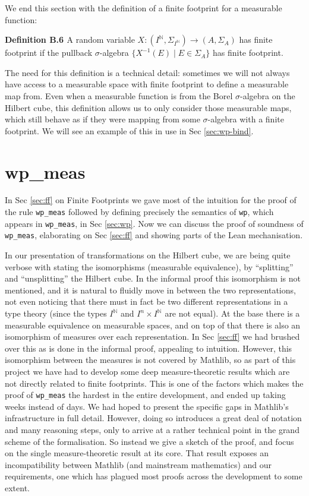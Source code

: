 We end this section with the definition of a finite footprint for a measurable function:

\textbf{Definition B.6 \citep[Appendix B]{lilac}} A random variable $X : (I^\mathbb{N}, \Sigma_{I^\mathbb{N}}) \to (A, \Sigma_A)$ has finite footprint if the pullback $\sigma$-algebra $\{X^{-1}(E) \mid E \in \Sigma_A\}$ has finite footprint.

The need for this definition is a technical detail: sometimes we will not always have access to a measurable space with finite footprint to define a measurable map from. Even when a measurable function
is from the Borel $\sigma$-algebra on the Hilbert cube, this definition allows us to only consider those measurable maps, which still behave as if they were mapping from some $\sigma$-algebra
with a finite footprint. We will see an example of this in use in Sec \ref{sec:wp-bind}.

\section{wp\_meas}
\label{sec:wp-meas}

In Sec \ref{sec:ff} on Finite Footprints we gave most of the intuition for the proof of the rule \texttt{wp\_meas} followed by defining precisely the semantics of \texttt{wp}, which appears in
\texttt{wp\_meas}, in Sec \ref{sec:wp}. Now we can discuss the proof of soundness of \texttt{wp\_meas}, elaborating on Sec \ref{sec:ff} and showing parts of the Lean mechanisation.

In our presentation of transformations on the Hilbert cube, we are being quite verbose with stating the isomorphisms (measurable equivalence), by ``splitting'' and ``unsplitting'' the Hilbert cube. In the
informal proof this isomorphism is not mentioned, and it is natural to fluidly move in between the two representations, not even noticing that there must in
fact be two different representations in a type theory (since the types $I^\mathbb{N}$ and $I^n \times I^\mathbb{N}$ are not equal). At the base there is a measurable equivalence on measurable spaces,
and on top of that there is also an isomorphism of measures over
each representation. In Sec \ref{sec:ff} we had brushed over this as is done in the informal proof, appealing to intuition. However, this isomorphism between the measures is not covered by
Mathlib, so as part of this project we have had to develop some deep measure-theoretic results which are not directly related to finite footprints.
This is one of the factors which makes the proof of \texttt{wp\_meas} the hardest in the entire development, and ended up taking weeks instead of days.
We had hoped to present the specific gaps in Mathlib's infrastructure in full detail. However, doing so introduces a great deal of notation and many
reasoning steps, only to arrive at a rather technical point in the grand scheme of the formalisation. So instead we give a sketch of the proof, and focus on the
single measure-theoretic result at its core. That result exposes an incompatibility between Mathlib (and mainstream mathematics) and our requirements, one which
has plagued most proofs across the development to some extent.

